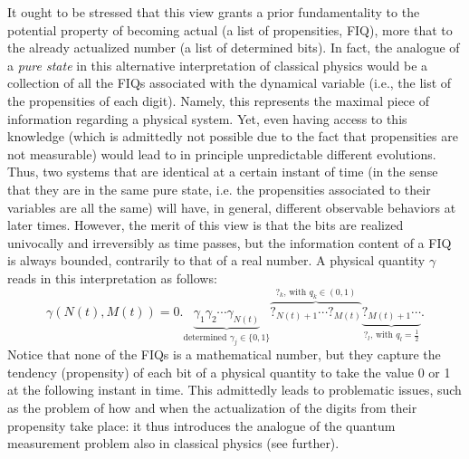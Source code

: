 \documentclass[12pt]{article}
\begin{document}
It ought to be stressed that this view grants a prior fundamentality to the potential property of becoming actual (a list of propensities, FIQ), more that to the already actualized number (a list of determined bits). {In fact, the analogue of a \emph{pure state} in this alternative interpretation of classical physics would be a collection of all the FIQs associated with the dynamical variable (i.e., the list of the propensities of each digit). Namely, this represents the maximal piece of information regarding a physical system. Yet, even having access to this knowledge (which is admittedly not possible due to the fact that propensities are not measurable) would lead to in principle unpredictable different evolutions. Thus, two systems that are identical at a certain instant of time (in the sense that they are in the same pure state, i.e. the propensities associated to their variables are all the same) will have, in general, different observable behaviors at later times.} However, the merit of this view is that the bits are realized univocally and irreversibly as time passes, but the information content of a FIQ is always bounded, contrarily to that of a real number. A physical quantity $\gamma$ reads in this interpretation as follows:
%
\begin{equation*}
\gamma \left(N(t), M(t)\right)=0.\underbrace{\gamma_1\gamma_2\cdots \gamma_{N(t)}}_{\textrm{determined }\gamma_j\in \{0, 1\}} \overbrace{?_{N(t)+1}\cdots ?_{M(t)}}^{?_k\textrm{, with } q_k\in(0, 1)}\underbrace{?_{M(t)+1}\cdots}_{?_l\textrm{, with } q_l=\frac{1}{2}}.
\end{equation*}
%
Notice that none of the FIQs is a mathematical number, but they capture the tendency (propensity) of each bit of a physical quantity to take the value 0 or 1 at the following instant in time. This admittedly leads to problematic issues, such as the problem of how and when the actualization of the digits from their propensity take place: it thus introduces the analogue of the quantum measurement problem also in classical physics (see further).
\end{document}

